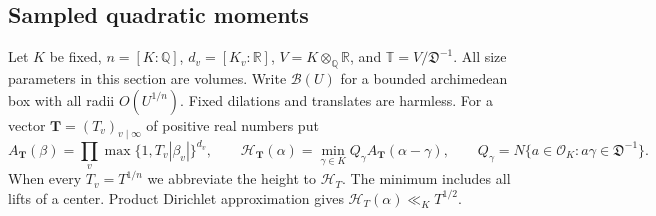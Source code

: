\documentclass[11pt]{amsart}
\theoremstyle{definition}
\numberwithin{equation}{section}
\begin{document}
\subsection{Sampled quadratic moments}
\label{sec:quad-sampling-field}

Let $K$ be fixed, $n=[K:\mathbb Q]$, $d_v=[K_v:\mathbb R]$,
$V=K\otimes_{\mathbb Q}\mathbb R$, and
$\mathbb T=V/\mathfrak D^{-1}$. All size parameters in this section
are volumes. Write $\mathcal B(U)$ for a bounded archimedean box with
all radii $O(U^{1/n})$. Fixed dilations and translates are harmless.
For a vector $\mathbf T=(T_v)_{v\mid\infty}$ of positive real numbers put
\[
 A_{\mathbf T}(\beta)=\prod_v\max\{1,T_v|\beta_v|\}^{d_v},\qquad
 \mathcal H_{\mathbf T}(\alpha)=
       \min_{\gamma\in K} Q_\gamma A_{\mathbf T}(\alpha-\gamma),
 \qquad
 Q_\gamma=N\{a\in\mathcal O_K:a\gamma\in\mathfrak D^{-1}\}.
\]
When every $T_v=T^{1/n}$ we abbreviate the height to $\mathcal H_T$.
The minimum includes all lifts of a center. Product Dirichlet approximation
gives $\mathcal H_T(\alpha)\ll_K T^{1/2}$.
\end{document}
